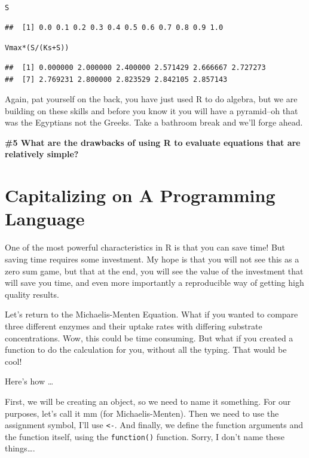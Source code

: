 \documentclass{tufte-handout}\usepackage[]{graphicx}\usepackage[]{xcolor}
\makeatletter
\newcommand{\hlopt}[1]{\textcolor[rgb]{0,0,0}{#1}}%
\newcommand{\hlstd}[1]{\textcolor[rgb]{0.345,0.345,0.345}{#1}}%
\newenvironment{kframe}{%
 \def\at@end@of@kframe{}%
 \ifinner\ifhmode%
  \def\at@end@of@kframe{\end{minipage}}%
  \begin{minipage}{\columnwidth}%
 \fi\fi%
 \def\FrameCommand##1{\hskip\@totalleftmargin \hskip-\fboxsep
 \colorbox{shadecolor}{##1}\hskip-\fboxsep
     \hskip-\linewidth \hskip-\@totalleftmargin \hskip\columnwidth}%
 \MakeFramed {\advance\hsize-\width
   \@totalleftmargin\z@ \linewidth\hsize
   \@setminipage}}%
 {\par\unskip\endMakeFramed%
 \at@end@of@kframe}
\newenvironment{knitrout}{}{} %
\makeatother
\begin{document}
\begin{knitrout}
\color{fgcolor}\begin{kframe}
\begin{alltt}
\hlstd{S}
\end{alltt}
\begin{verbatim}
##  [1] 0.0 0.1 0.2 0.3 0.4 0.5 0.6 0.7 0.8 0.9 1.0
\end{verbatim}
\begin{alltt}
\hlstd{Vmax}\hlopt{*}\hlstd{(S}\hlopt{/}\hlstd{(Ks} \hlopt{+} \hlstd{S))}
\end{alltt}
\begin{verbatim}
##  [1] 0.000000 2.000000 2.400000 2.571429 2.666667 2.727273
##  [7] 2.769231 2.800000 2.823529 2.842105 2.857143
\end{verbatim}
\end{kframe}
\end{knitrout}

Again, pat yourself on the back, you have just used R to do algebra, but we are building on these skills and before you know it you will have a pyramid--oh that was the Egyptians not the Greeks. Take a bathroom break and we'll forge ahead.

\bigskip
\noindent \textbf{\#5 What are the drawbacks of using R to evaluate equations that are relatively simple? }

\section{Capitalizing on A Programming Language}

One of the most powerful characteristics in R is that you can save time! But saving time requires some investment. My hope is that you will not see this as a zero sum game, but that at the end, you will see the value of the investment that will save you time, and even more importantly a reproducible way of getting high quality results. 

Let's return to the Michaelis-Menten Equation. What if you wanted to compare three different enzymes and their uptake rates with differing substrate concentrations. Wow, this could be time consuming. But what if you created a function to do the calculation for you, without all the typing. That would be cool!

\noindent Here's how \ldots

First, we will be creating an object, so we need to name it something. For our purposes, let's call it mm (for Michaelis-Menten). Then we need to use the assignment symbol, I'll use \texttt{<-}. And finally, we define the function arguments and the function itself, using the \texttt{function()} function. Sorry, I don't name these things\ldots. 
\end{document}
